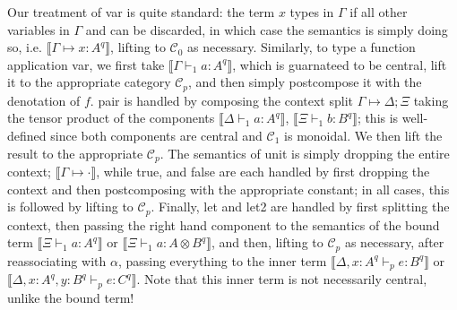 \documentclass[acmsmall,screen,review]{acmart}
\newcommand{\mc}[1]{\ensuremath{\mathcal{#1}}}
\newcommand{\csplits}[3]{#1 \mapsto #2;#3}
\newcommand{\cwk}[2]{#1 \mapsto #2}
\newcommand{\thyp}[3]{#1: {#2}^{#3}}
\newcommand{\rle}[1]{{\scriptsize\textsf{#1}}}
\newcommand{\hasty}[5]{#1 \vdash_{#2} #3: {#4}^{#5}}
\newcommand{\dnt}[1]{\llbracket{#1}\rrbracket}
\begin{document}
Our treatment of \rle{var} is quite standard: the term \(x\) types in \(\Gamma\)
if all other variables in \(\Gamma\) and can be discarded, in which case the
semantics is simply doing so, i.e. \(\dnt{\cwk{\Gamma}{\thyp{x}{A}{q}}}\),
lifting to \(\mc{C}_0\) as necessary. Similarly, to type a function application
\rle{var}, we first take \(\dnt{\hasty{\Gamma}{1}{a}{A}{q}}\), which is
guarnateed to be central, lift it to the appropriate category \(\mc{C}_p\), and
then simply postcompose it with the denotation of \(f\). \rle{pair} is handled
by composing the context split \(\csplits{\Gamma}{\Delta}{\Xi}\) taking the
tensor product of the components \(\dnt{\hasty{\Delta}{1}{a}{A}{q}}\),
\(\dnt{\hasty{\Xi}{1}{b}{B}{q}}\); this is well-defined since both components
are central and \(\mc{C}_1\) is monoidal. We then lift the result to the
appropriate \(\mc{C}_p\). The semantics of \rle{unit} is simply dropping the
entire context; \(\dnt{\cwk{\Gamma}{\cdot}}\), while \rle{true}, and \rle{false}
are each handled by first dropping the context and then postcomposing with the
appropriate constant; in all cases, this is followed by lifting to \(\mc{C}_p\).
Finally, \rle{let} and \rle{let2} are handled by first splitting the context,
then passing the right hand component to the semantics of the bound term
\(\dnt{\hasty{\Xi}{1}{a}{A}{q}}\) or \(\dnt{\hasty{\Xi}{1}{a}{A \otimes
B}{q}}\), and then, lifting to \(\mc{C}_p\) as necessary, after reassociating
with \(\alpha\), passing everything to the inner term \(\dnt{\hasty{\Delta,
\thyp{x}{A}{q}}{p}{e}{B}{q}}\) or \(\dnt{\hasty{\Delta, \thyp{x}{A}{q},
\thyp{y}{B}{q}}{p}{e}{C}{q}}\). Note that this inner term is not necessarily
central, unlike the bound term!
\end{document}
